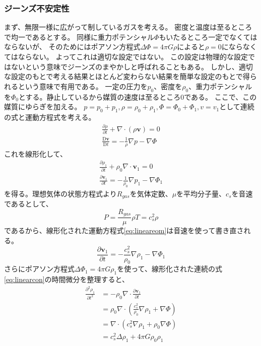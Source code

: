 \documentclass{jsarticle}
\newcommand{\bv}{\mathbf{v}}
\newcommand{\pder}[2][]{\frac{\partial#1}{\partial#2}}
\newcommand{\ppder}[2][]{\frac{\partial^2#1}{\partial#2^2}}
\newcommand{\Dder}[2][]{\frac{\mathrm{D}#1}{\mathrm{D}#2}}
\newcommand{\beq}{\begin{equation}}
\newcommand{\eeq}{\end{equation}}
\begin{document}
\subsubsection{ジーンズ不安定性}
まず、無限一様に広がって制しているガスを考える。
密度と温度は至るところで均一であるとする。
同様に重力ポテンシャル$\Phi$もいたるところ一定でなくてはならないが、
そのためにはポアソン方程式$\Delta \Phi = 4 \pi G \rho$によると$\rho=0$にならなくてはならない。
よってこれは適切な設定ではない。
この設定は物理的な設定ではないという意味でジーンズのまやかしと呼ばれることもある。
しかし、適切な設定のもとで考える結果とほとんど変わらない結果を簡単な設定のもとで得られるという意味で有用である。
一定の圧力を$p_0$、密度を$\rho_0$、重力ポテンシャルを$\Phi_0$とする。静止しているから媒質の速度は至るところ$0$である。
ここで、この媒質にゆらぎを加える。
$p = p_0 + p_1,\rho = \rho_0 + \rho_1,\Phi = \Phi_0 + \Phi_1, v = v_1$として連続の式と運動方程式を考える。
\begin{align}
    \pder[\rho]{t} + \nabla \cdot (\rho \bv) = 0\label{eq:linearcon}
\\
    \Dder[\bv]{t} = - \frac{1}{\rho}\nabla p - \nabla \Phi\label{eq:lineareom}
\end{align}
これを線形化して、
\begin{align}
    \pder[\rho_1]{t} + \rho_0\nabla \cdot \bv_1 = 0\\
    \pder[\bv_1]{t} = - \frac{1}{\rho_0}\nabla p_1 - \nabla \Phi_1
\end{align}
を得る。理想気体の状態方程式より$R_{gas}$を気体定数、$\mu$を平均分子量、$c_s$を音速であるとして、
\beq
P = \frac{R_{gas}}{\mu} \rho T = c_s^2 \rho
\eeq
であるから、線形化された運動方程式\eqref{eq:lineareom}は音速を使って書き直される。
\beq
    \pder[\bv_1]{t} = - \frac{c_s^2}{\rho_0}\nabla \rho_1 - \nabla \Phi_1
\eeq
さらにポアソン方程式$\Delta \Phi_1 = 4 \pi G\rho_1$を使って、線形化された連続の式\eqref{eq:linearcon}の時間微分を整理すると、
\begin{align}
    \ppder[\rho_1]{t} &= - \rho_0 \nabla \cdot \pder[\bv_1]{t}\\
                      &= \rho_0 \nabla \cdot \left(\frac{c_s^2}{\rho_0}\nabla \rho_1 + \nabla \Phi\right)\\
                      &= \nabla \cdot \left(c_s^2\nabla \rho_1 + \rho_0\nabla \Phi\right)\\
                      &= c_s^2\Delta\rho_1 + 4\pi G\rho_0\rho_1
\end{align}
\end{document}
